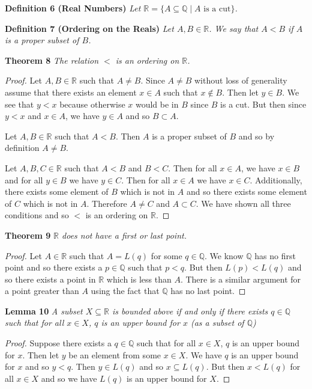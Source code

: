 \documentclass{article}
\begin{document}
\begin{flushleft}
\textbf{Definition 6 (Real Numbers)}
\textsl{Let $\mathbb{R} = \{A \subseteq \mathbb{Q} \mid A \text{ is a cut}\}$.}
\newline

\textbf{Definition 7 (Ordering on the Reals)}
\textsl{Let $A, B \in \mathbb{R}$. We say that $A < B$ if $A$ is a proper subset of $B$.}
\newline

\textbf{Theorem 8}
\textsl{The relation $<$ is an ordering on $\mathbb{R}$.}
\begin{proof}
Let $A, B \in \mathbb{R}$ such that $A \neq B$. Since $A \neq B$ without loss of generality assume that there exists an element $x \in A$ such that $x \notin B$. Then let $y \in B$. We see that $y<x$ because otherwise $x$ would be in $B$ since $B$ is a cut. But then since $y<x$ and $x \in A$, we have $y \in A$ and so $B \subset A$.\newline

Let $A, B \in \mathbb{R}$ such that $A<B$. Then $A$ is a proper subset of $B$ and so by definition $A \neq B$.\newline

Let $A, B, C \in \mathbb{R}$ such that $A < B$ and $B < C$. Then for all $x \in A$, we have $x \in B$ and for all $y \in B$ we have $y \in C$. Then for all $x \in A$ we have $x \in C$. Additionally, there exists some element of $B$ which is not in $A$ and so there exists some element of $C$ which is not in $A$. Therefore $A \neq C$ and $A \subset C$. We have shown all three conditions and so $<$ is an ordering on $\mathbb{R}$.
\end{proof}

\textbf{Theorem 9}
\textsl{$\mathbb{R}$ does not have a first or last point.}
\begin{proof}
Let $A \in \mathbb{R}$ such that $A = L(q)$ for some $q \in \mathbb{Q}$. We know $\mathbb{Q}$ has no first point and so there exists a $p \in \mathbb{Q}$ such that $p<q$. But then $L(p) < L(q)$ and so there exists a point in $\mathbb{R}$ which is less than $A$. There is a similar argument for a point greater than $A$ using the fact that $\mathbb{Q}$ has no last point.
\end{proof}

\textbf{Lemma 10}
\textsl{A subset $X \subseteq \mathbb{R}$ is bounded above if and only if there exists $q \in \mathbb{Q}$ such that for all $x \in X$, $q$ is an upper bound for $x$ (as a subset of $\mathbb{Q}$)}
\begin{proof}
Suppose there exists a $q \in \mathbb{Q}$ such that for all $x \in X$, $q$ is an upper bound for $x$. Then let $y$ be an element from some $x \in X$. We have $q$ is an upper bound for $x$ and so $y<q$. Then $y \in L(q)$ and so $x \subseteq L(q)$. But then $x < L(q)$ for all $x \in X$ and so we have $L(q)$ is an upper bound for $X$.\newline


\end{proof}
\end{flushleft}
\end{document}
